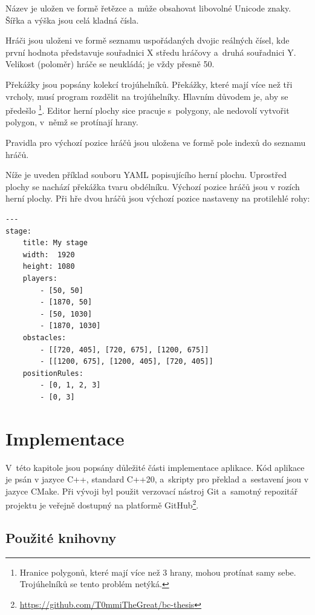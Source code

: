 Název je uložen ve formě řetězce a~může obsahovat libovolné Unicode znaky. Šířka a výška jsou celá kladná čísla.

Hráči jsou uloženi ve formě seznamu uspořádaných dvojic reálných čísel, kde první hodnota představuje souřadnici X středu hráčovy  a~druhá souřadnici Y. Velikost (poloměr) hráče se neukládá; je vždy přesně 50.

Překážky jsou popsány kolekcí trojúhelníků. Překážky, které mají více než tři vrcholy, musí program rozdělit na trojúhelníky. Hlavním důvodem je, aby se předešlo \footnote{Hranice polygonů, které mají více než 3 hrany, mohou protínat samy sebe. Trojúhelníků se tento problém netýká.}. Editor herní plochy sice pracuje s~polygony, ale nedovolí vytvořit polygon, v~němž se protínají hrany.

Pravidla pro výchozí pozice hráčů jsou uložena ve formě pole indexů do seznamu hráčů.

Níže je uveden příklad souboru YAML popisujícího herní plochu. Uprostřed plochy se nachází překážka tvaru obdélníku. Výchozí pozice hráčů jsou v rozích herní plochy. Při hře dvou hráčů jsou výchozí pozice nastaveny na protilehlé rohy:
\begin{center}
\begin{minipage}{\textwidth}
    \begin{verbatim}
---
stage:
    title: My stage
    width:  1920
    height: 1080
    players: 
        - [50, 50]
        - [1870, 50]
        - [50, 1030]
        - [1870, 1030]
    obstacles:
        - [[720, 405], [720, 675], [1200, 675]]
        - [[1200, 675], [1200, 405], [720, 405]]
    positionRules:
        - [0, 1, 2, 3]
        - [0, 3]
    \end{verbatim}
\end{minipage}
\end{center}


\chapter{Implementace}
\label{ch:implementace}

V~této kapitole jsou popsány důležité části implementace aplikace. Kód aplikace je psán v jazyce C++, standard C++20, a~skripty pro překlad a~sestavení jsou v jazyce CMake. Při vývoji byl použit verzovací nástroj Git a~samotný repozitář projektu je veřejně dostupný na platformě GitHub\footnote{\url{https://github.com/T0mmiTheGreat/bc-thesis}}.


\section{Použité knihovny}

